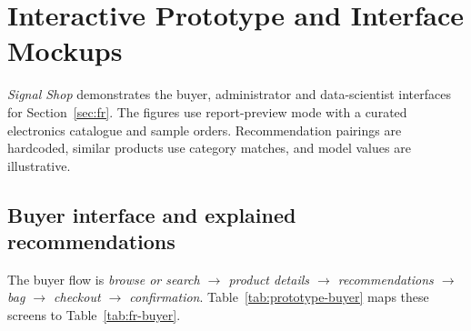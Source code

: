 \clearpage
\section{Interactive Prototype and Interface Mockups}
\label{sec:prototype}

\emph{Signal Shop} demonstrates the buyer, administrator and data-scientist
interfaces for Section~\ref{sec:fr}. The figures use report-preview mode with a
curated electronics catalogue and sample orders. Recommendation pairings are
hardcoded, similar products use category matches, and model values are illustrative.

\subsection{Buyer interface and explained recommendations}
\label{sec:prototype-buyer}

The buyer flow is \emph{browse or search $\rightarrow$ product details
$\rightarrow$ recommendations $\rightarrow$ bag $\rightarrow$ checkout
$\rightarrow$ confirmation}. Table~\ref{tab:prototype-buyer} maps these screens to
Table~\ref{tab:fr-buyer}.

